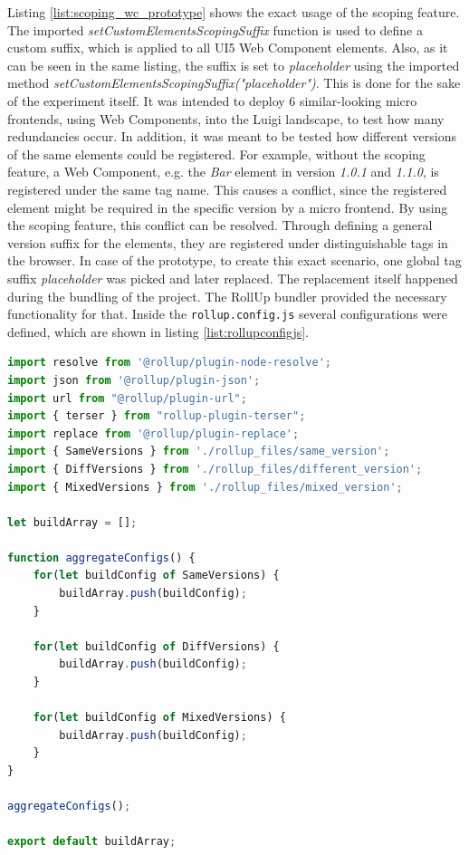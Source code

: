 Listing \ref{list:scoping_wc_prototype} shows the exact usage of the scoping feature. 
The imported \textit{setCustomElementsScopingSuffix} function is used to define a custom suffix, which is applied to all UI5 Web Component elements. 
Also, as it can be seen in the same listing, the suffix is set to \textit{placeholder} using the imported method \textit{setCustomElementsScopingSuffix("placeholder")}.
This is done for the sake of the experiment itself. 
It was intended to deploy 6 similar-looking micro frontends, using Web Components, into the Luigi landscape, to test how many redundancies occur. 
In addition, it was meant to be tested how different versions of the same elements could be registered. 
For example, without the scoping feature, a Web Component, e.g. the \textit{Bar} element in version \textit{1.0.1} and \textit{1.1.0}, is registered under the same tag name. 
This causes a conflict, since the registered element might be required in the specific version by a micro frontend. 
By using the scoping feature, this conflict can be resolved.
Through defining a general version suffix for the elements, they are registered under distinguishable tags in the browser.
In case of the prototype, to create this exact scenario, one global tag suffix \textit{placeholder} was picked and later replaced. The replacement itself happened during the bundling of the project. The RollUp bundler provided the necessary functionality for that.
Inside the \texttt{rollup.config.js} several configurations were defined, which are shown in listing \ref{list:rollupconfigjs}.
	
\begin{lstlisting}[language=JavaScript, caption=Content of the \texttt{rollup.config.js}, label=list:rollupconfigjs,  xleftmargin=.0\textwidth, xrightmargin=.0\textwidth]
import resolve from '@rollup/plugin-node-resolve';
import json from '@rollup/plugin-json';
import url from "@rollup/plugin-url";
import { terser } from "rollup-plugin-terser";
import replace from '@rollup/plugin-replace';
import { SameVersions } from './rollup_files/same_version';
import { DiffVersions } from './rollup_files/different_version';
import { MixedVersions } from './rollup_files/mixed_version';

let buildArray = [];

function aggregateConfigs() {
	for(let buildConfig of SameVersions) {
		buildArray.push(buildConfig);
	}
	
	for(let buildConfig of DiffVersions) {
		buildArray.push(buildConfig);
	}
	
	for(let buildConfig of MixedVersions) {
		buildArray.push(buildConfig);
	}
}
	
aggregateConfigs();

export default buildArray;
\end{lstlisting}
	
